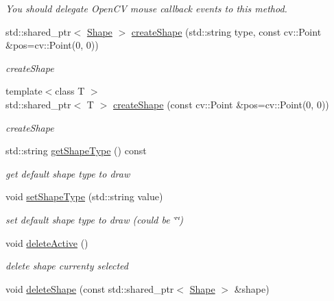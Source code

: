 \begin{DoxyCompactItemize}
\begin{DoxyCompactList}\small\item\em You should delegate Open\+CV mouse callback events to this method. \end{DoxyCompactList}\item 
std\+::shared\+\_\+ptr$<$ \hyperlink{classcanvascv_1_1Shape}{Shape} $>$ \hyperlink{classcanvascv_1_1Canvas_a630ac92458f1718d0c597e96dd5a4aef}{create\+Shape} (std\+::string type, const cv\+::\+Point \&pos=cv\+::\+Point(0, 0))
\begin{DoxyCompactList}\small\item\em create\+Shape \end{DoxyCompactList}\item 
{\footnotesize template$<$class T $>$ }\\std\+::shared\+\_\+ptr$<$ T $>$ \hyperlink{classcanvascv_1_1Canvas_ac126ef1547509744d9968ba83ddfef36}{create\+Shape} (const cv\+::\+Point \&pos=cv\+::\+Point(0, 0))
\begin{DoxyCompactList}\small\item\em create\+Shape \end{DoxyCompactList}\item 
std\+::string \hyperlink{classcanvascv_1_1Canvas_a910107e17ee39da2074f9688e2a307ae}{get\+Shape\+Type} () const 
\begin{DoxyCompactList}\small\item\em get default shape type to draw \end{DoxyCompactList}\item 
void \hyperlink{classcanvascv_1_1Canvas_ac61735c6f4cb6a88d84331540ab25d39}{set\+Shape\+Type} (std\+::string value)
\begin{DoxyCompactList}\small\item\em set default shape type to draw (could be \char`\"{}\char`\"{}) \end{DoxyCompactList}\item 
void \hyperlink{classcanvascv_1_1Canvas_a2fb88addb88a21757d4272e64acd30ae}{delete\+Active} ()\hypertarget{classcanvascv_1_1Canvas_a2fb88addb88a21757d4272e64acd30ae}{}\label{classcanvascv_1_1Canvas_a2fb88addb88a21757d4272e64acd30ae}

\begin{DoxyCompactList}\small\item\em delete shape currenty selected \end{DoxyCompactList}\item 
void \hyperlink{classcanvascv_1_1Canvas_a4cabdb76b4f6854e957a065c29ab5669}{delete\+Shape} (const std\+::shared\+\_\+ptr$<$ \hyperlink{classcanvascv_1_1Shape}{Shape} $>$ \&shape)\hypertarget{classcanvascv_1_1Canvas_a4cabdb76b4f6854e957a065c29ab5669}{}\label{classcanvascv_1_1Canvas_a4cabdb76b4f6854e957a065c29ab5669}


\end{DoxyCompactItemize}
